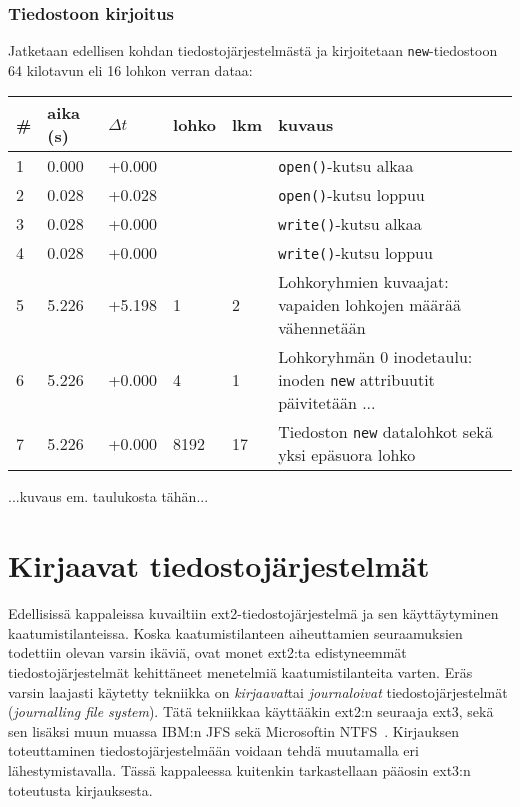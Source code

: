 \subsubsection{Tiedostoon kirjoitus}
\label{ChapExt2FileWrite}
Jatketaan edellisen kohdan tiedostojärjestelmästä ja kirjoitetaan \texttt{new}-tiedostoon 64 kilotavun eli 16 lohkon verran dataa:
\begin{table}[H]
\begin{tabular}{l | l | l | l | l | p{7cm}}
    \# & aika (s) & $\Delta t$ & lohko & lkm & kuvaus \\ \hline \hline
    1  & 0.000    & +0.000   &      &      & \texttt{open()}-kutsu alkaa    \\ \hline %
    2  & 0.028    & +0.028   &      &      & \texttt{open()}-kutsu loppuu   \\ \hline %
    3  & 0.028    & +0.000   &      &      & \texttt{write()}-kutsu alkaa   \\ \hline %
    4  & 0.028    & +0.000   &      &      & \texttt{write()}-kutsu loppuu  \\ \hline %
    5  & 5.226    & +5.198   & 1    & 2    & Lohkoryhmien kuvaajat: vapaiden lohkojen määrää vähennetään          \\ \hline %
    6  & 5.226    & +0.000   & 4    & 1    & Lohkoryhmän 0 inodetaulu: inoden \texttt{new} attribuutit päivitetään ...      \\ \hline %
    7  & 5.226    & +0.000   & 8192 & 17   & Tiedoston \texttt{new} datalohkot sekä yksi epäsuora lohko                               \\        %
\end{tabular}
\end{table}

...kuvaus em. taulukosta tähän...

\section{Kirjaavat tiedostojärjestelmät}
\label{ChapJournallingFs}
Edellisissä kappaleissa kuvailtiin ext2-tiedostojärjestelmä ja sen käyttäytyminen kaatumistilanteissa.
Koska kaatumistilanteen aiheuttamien seuraamuksien todettiin olevan varsin ikäviä,
ovat monet ext2:ta edistyneemmät tiedostojärjestelmät kehittäneet menetelmiä kaatumistilanteita varten.
Eräs varsin laajasti käytetty tekniikka on \emph{kirjaavat}tai \emph{journaloivat} tiedostojärjestelmät (\emph{journalling file system}).
Tätä tekniikkaa käyttääkin ext2:n seuraaja ext3, sekä sen lisäksi
muun muassa IBM:n JFS sekä Microsoftin NTFS~\cite{JournalingAnalysis}.
Kirjauksen toteuttaminen tiedostojärjestelmään voidaan tehdä muutamalla eri lähestymistavalla.
Tässä kappaleessa kuitenkin tarkastellaan pääosin ext3:n toteutusta kirjauksesta.

